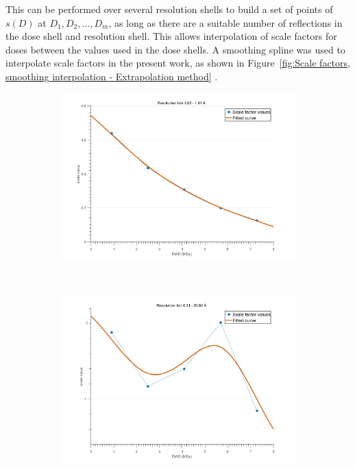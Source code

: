This can be performed over several resolution shells to build a set of points of $s(D)$ at $D_1, D_2,\ldots, D_m$, as long as there are a suitable number of reflections in the dose shell and resolution shell.
This allows interpolation of scale factors for doses between the values used in the dose shells.
A smoothing spline was used to interpolate scale factors in the present work, as shown in Figure~\ref{fig:Scale factors, smoothing interpolation - Extrapolation method} .
\begin{figure}
        \centering
        \begin{subfigure}[b]{0.9\textwidth}
                \centering
                \includegraphics[width=\textwidth]{figures/zde/scale_fit_bin12.pdf}
                \caption{}
                \label{fig:monotonic scale factor - Extrapolation method}
        \end{subfigure}
				\\
        \begin{subfigure}[b]{0.9\textwidth}
                \centering
                \includegraphics[width=\textwidth]{figures/zde/scale_fit_bin1.pdf}

\end{subfigure}
\end{figure}
